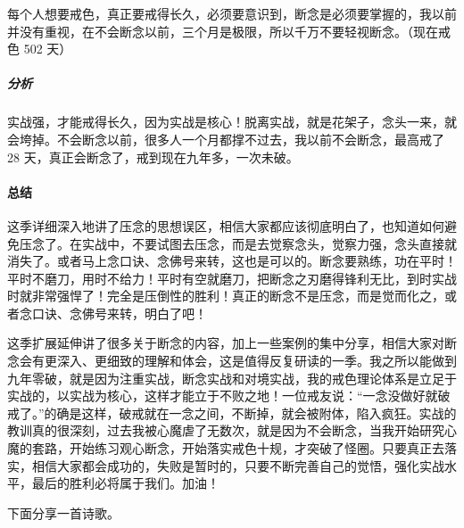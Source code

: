 \begin{case}
    每个人想要戒色，真正要戒得长久，必须要意识到，断念是必须要掌握的，我以前并没有重视，在不会断念以前，三个月是极限，所以千万不要轻视断念。（现在戒色 502 天）
    \subparagraph{分析} 实战强，才能戒得长久，因为实战是核心！脱离实战，就是花架子，念头一来，就会垮掉。不会断念以前，很多人一个月都撑不过去，我以前不会断念，最高戒了 28 天，真正会断念了，戒到现在九年多，一次未破。
\end{case}

\paragraph{总结}

这季详细深入地讲了压念的思想误区，相信大家都应该彻底明白了，也知道如何避免压念了。在实战中，不要试图去压念，而是去觉察念头，觉察力强，念头直接就消失了。或者马上念口诀、念佛号来转，这也是可以的。断念要熟练，功在平时！平时不磨刀，用时不给力！平时有空就磨刀，把断念之刃磨得锋利无比，到时实战时就非常强悍了！完全是压倒性的胜利！真正的断念不是压念，而是觉而化之，或者念口诀、念佛号来转，明白了吧！

这季扩展延伸讲了很多关于断念的内容，加上一些案例的集中分享，相信大家对断念会有更深入、更细致的理解和体会，这是值得反复研读的一季。我之所以能做到九年零破，就是因为注重实战，断念实战和对境实战，我的戒色理论体系是立足于实战的，以实战为核心，这样才能立于不败之地！一位戒友说：“一念没做好就破戒了。”的确是这样，破戒就在一念之间，不断掉，就会被附体，陷入疯狂。实战的教训真的很深刻，过去我被心魔虐了无数次，就是因为不会断念，当我开始研究心魔的套路，开始练习观心断念，开始落实戒色十规，才突破了怪圈。只要真正去落实，相信大家都会成功的，失败是暂时的，只要不断完善自己的觉悟，强化实战水平，最后的胜利必将属于我们。加油！

下面分享一首诗歌。

